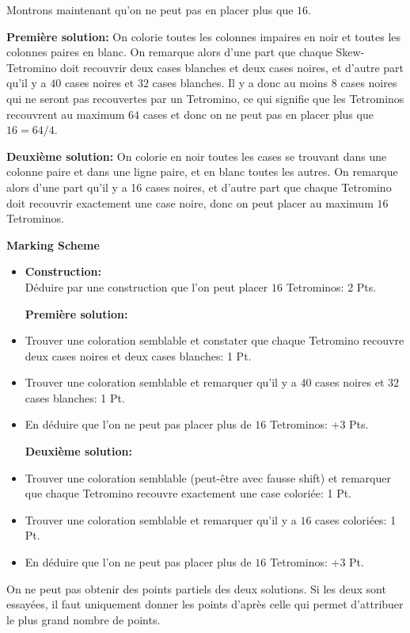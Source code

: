 \documentclass[language=german,style=solution]{smo}
\begin{document}
\begin{enumerate}
Montrons maintenant qu'on ne peut pas en placer plus que $16$.
	
\textbf{Première solution:} On colorie toutes les colonnes impaires en noir et toutes les colonnes paires en blanc. On remarque alors d'une part que chaque Skew-Tetromino doit recouvrir deux cases blanches et deux cases noires, et d'autre part qu'il y a $40$ cases noires et $32$ cases blanches. Il y a donc au moins $8$ cases noires qui ne seront pas recouvertes par un Tetromino, ce qui signifie que les Tetrominos recouvrent au maximum $64$ cases et donc on ne peut pas en placer plus que $16 = 64/4$.
	
\textbf{Deuxième solution:} On colorie en noir toutes les cases se trouvant dans une colonne paire et dans une ligne paire, et en blanc toutes les autres. On remarque alors d'une part qu'il y a 16 cases noires, et d'autre part que chaque Tetromino doit recouvrir exactement une case noire, donc on peut placer au maximum $16$ Tetrominos.

\textbf{Marking Scheme}
	\begin{itemize}
		\item \textbf{Construction:}\\
			Déduire par une construction que l'on peut placer $16$ Tetrominos: 2 Pts.
		
		\textbf{Première solution:}
		\item Trouver une coloration semblable et constater que chaque Tetromino recouvre deux cases noires et deux cases blanches: 1 Pt.
		\item Trouver une coloration semblable et remarquer qu'il y a $40$ cases noires et $32$ cases blanches: 1 Pt.
		\item En déduire que l'on ne peut pas placer plus de $16$ Tetrominos: +3 Pts.
		
		\textbf{Deuxième solution:}
		\item Trouver une coloration semblable (peut-être avec fausse shift) et remarquer que chaque Tetromino recouvre exactement une case coloriée: 1 Pt.
		\item Trouver une coloration semblable et remarquer qu'il y a $16$ cases coloriées: 1 Pt.
		\item En déduire que l'on ne peut pas placer plus de $16$ Tetrominos: +3 Pt.
	\end{itemize}
On ne peut pas obtenir des points partiels des deux solutions. Si les deux sont essayées, il faut uniquement donner les points d'après celle qui permet d'attribuer le plus grand nombre de points.


\end{enumerate}
\end{document}
